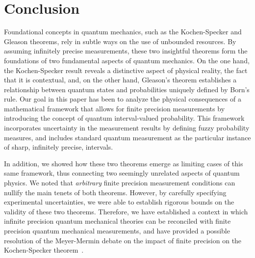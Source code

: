 \documentclass[english,reprint, aps, prl,superscriptaddress, showpacs,
showkeys, longbibliography, amsmath, amssymb, floatfix]{revtex4-1}
\theoremstyle{plain}
\theoremstyle{definition}
\newcommand{\says}[3]{\begin{framed}\begin{minipage}{0.9\linewidth}\color{#1}{#2 says: #3}\end{minipage}\end{framed}}
\newcommand{\andy}[1]{\says{blue}{Andy}{#1}}
\begin{document}
\section{Conclusion}
\label{sec:Conclusion}
  
Foundational concepts in quantum mechanics, such as the Kochen-Specker
and Gleason theorems, rely in subtle ways on the use of
unbounded resources. By assuming infinitely precise measurements,
these two insightful theorems form the foundations of two fundamental aspects of
quantum mechanics. On the one hand, the Kochen-Specker result reveals a
distinctive aspect of physical reality, the fact that it is
contextual, and, on the other hand, Gleason's theorem establishes a
relationship between quantum states and probabilities uniquely defined
by Born's rule.  Our goal in this paper has been to analyze the
physical consequences of a mathematical framework that allows for
finite precision measurements by introducing the concept of quantum
interval-valued probability. This framework incorporates uncertainty
in the measurement results by defining fuzzy probability measures, and
includes standard quantum measurement as the particular instance of
sharp, infinitely precise, intervals.  

In addition, we showed how these two theorems emerge as limiting cases
of this same framework, thus connecting two seemingly unrelated
aspects of quantum physics. We noted that {\it arbitrary\/} finite
precision measurement conditions can nullify the main tenets of both
theorems. However, by carefully specifying experimental uncertainties,
we were able to establish rigorous bounds on the validity of these two
theorems. Therefore, we have established a context in which infinite
precision quantum mechanical theories can be reconciled with finite
precision quantum mechanical measurements, and have provided a
possible resolution of the Meyer-Mermin debate on the impact of finite
precision on the Kochen-Specker
theorem~\cite{PhysRevLett.83.3751,Mermin1999}.


% 

\end{document}
